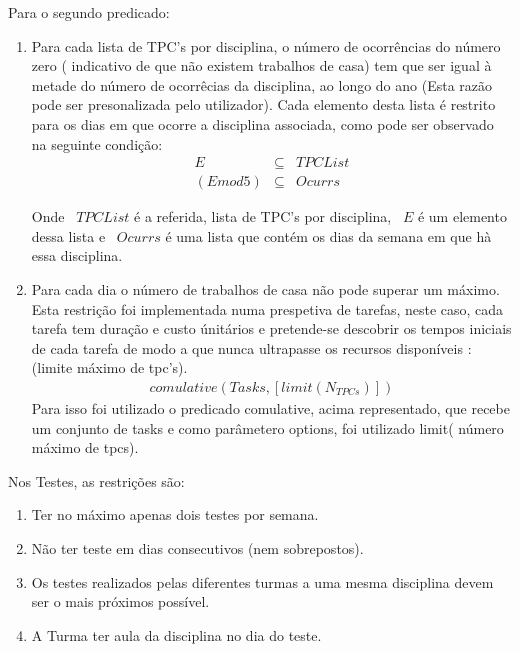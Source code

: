 \documentclass{llncs}
\begin{document}
Para o segundo predicado:
\begin{enumerate}
\item Para cada lista de TPC's por disciplina, o número de ocorrências do número zero ( indicativo de que não existem trabalhos de casa) tem que ser igual à metade do número de ocorrêcias da disciplina, ao longo do ano (Esta razão pode ser presonalizada pelo utilizador).
Cada elemento desta lista é restrito para os dias em que ocorre a disciplina associada, como pode ser observado na seguinte condição:
\begin{equation}
\begin{array}{rcl}
 E &\subseteq& TPCList \\
 (E mod 5) &\subseteq& Ocurrs
\end{array}
\end{equation}

Onde ~$TPCList$ é a referida, lista de TPC's por disciplina, ~$E$ é um elemento dessa lista e ~$Ocurrs$ é uma lista que contém os dias da semana em que hà essa disciplina.

\item Para cada dia o número de trabalhos de casa não pode superar um máximo.
Esta restrição foi implementada numa prespetiva de tarefas, neste caso, cada tarefa tem duração e custo únitários e pretende-se descobrir os tempos iniciais de cada tarefa de modo a que nunca ultrapasse os recursos disponíveis : (limite máximo de tpc's).
\begin{equation}
\begin{array}{rcl}
 comulative( Tasks, [limit(N_{TPCs})])
\end{array}
\end{equation}
Para isso foi utilizado o predicado comulative, acima representado, que recebe um conjunto de tasks e como parâmetero options, foi utilizado limit( número máximo de tpcs).

\end{enumerate}

Nos Testes, as restrições são:

\begin{enumerate}
\item Ter no máximo apenas dois testes por semana.

\item Não ter teste em dias consecutivos (nem sobrepostos).

\item Os testes realizados pelas diferentes turmas a uma mesma disciplina devem ser o mais próximos possível.

\item A Turma ter aula da disciplina no dia do teste.
\end{enumerate}
\end{document}
